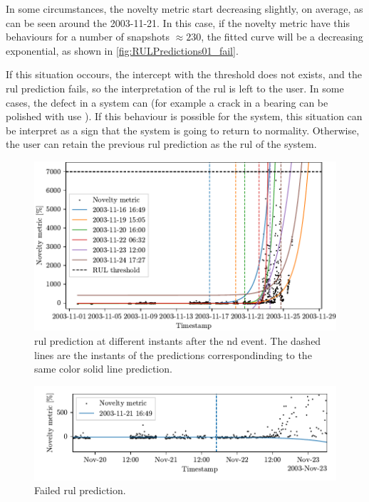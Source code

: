 In some circumstances, the novelty metric start decreasing slightly, on average, as can be seen around the 2003-11-21. In this case, if the novelty metric have this behaviours for a number of snapshots $\approx 230$, the fitted curve will be a decreasing exponential, as shown in \autoref{fig:RULPredictions01_fail}. 

If this situation occours, the intercept with the threshold does not exists, and the \gls{rul} prediction fails, so the interpretation of the \gls{rul} is left to the user. In some cases, the defect in a system can  (for example a crack in a bearing can be polished with use \cite{IMSpaper}). If this behaviour is possible for the system, this situation can be interpret as a sign that the system is going to return to normality. Otherwise, the user can retain the previous \gls{rul} prediction as the \gls{rul} of the system.

\begin{figure}
    \includegraphics{images/IMS/Novelty_01_500samples_bearing3x_predictions.pdf}
    \caption{\gls{rul} prediction at different instants after the \gls{nd} event. The dashed lines are the instants of the predictions correspondinding to the same color solid line prediction.}
    \label{fig:RULPredictions01}
\end{figure}

\begin{figure}
    \includegraphics{images/IMS/Novelty_01_500samples_bearing3x_predictions_failed.pdf}
    \caption{Failed \gls{rul} prediction.}
    \label{fig:RULPredictions01_fail}
\end{figure}

